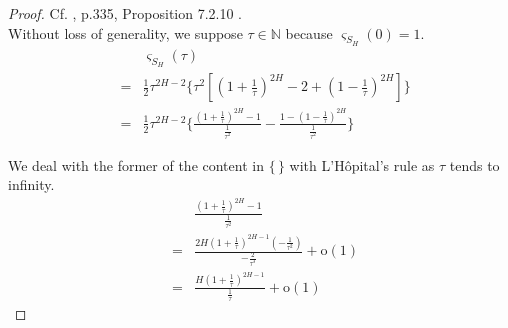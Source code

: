 \documentclass[a4paper, twoside, 11pt]{article}
\theoremstyle{definition}
\newcommand{\brkt}[1]{\left({#1} \right)}
\begin{document}
\begin{proof}
  Cf. \cite{nourdin}, p.335, Proposition 7.2.10 .\\
  Without loss of generality, we suppose $\tau \in \mathbb{N}$ because $\varsigma_{S_H}(0)=1$. 
  \begin{eqnarray*}
	&&\varsigma_{S_H}(\tau) \\
  &=& \frac{1}{2} \tau^{2H-2}\{ \tau^2[(1+\frac{1}{\tau})^{2H} - 2 + (1-\frac{1}{\tau})^{2H}] \} \\
  &=& \frac{1}{2} \tau^{2H-2}\{ \frac{(1+\frac{1}{\tau})^{2H} - 1 } {\frac{1}{\tau^2}} -  \frac{1 - (1-\frac{1}{\tau})^{2H}} {\frac{1}{\tau^2}} \}
\end{eqnarray*}

We deal with the former of the content in $\{\,\}$ with L'H\^opital's rule as $\tau$ tends to infinity.
\begin{eqnarray*}
  &&\frac{(1+\frac{1}{\tau})^{2H} - 1 } {\frac{1}{\tau^2}} \\
&=& \frac{2H(1+\frac{1}{\tau})^{2H-1}(-\frac{1}{\tau^2})}{-\frac{2}{\tau^3}} + \mathrm{o}(1)\\
&=& \frac{H(1+\frac{1}{\tau})^{2H-1}}{\frac{1}{\tau}} + \mathrm{o}(1)
\end{eqnarray*}


\end{proof}
\end{document}
